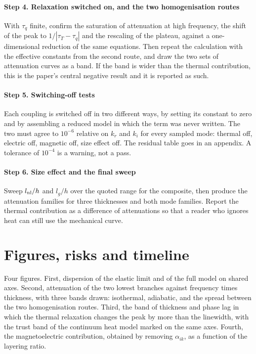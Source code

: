 \documentclass[11pt]{article}
\begin{document}
\paragraph{Step 4. Relaxation switched on, and the two homogenisation routes} With $\tau_q$ finite, confirm the
saturation of attenuation at high frequency, the shift of the peak to $1/|\tau_T-\tau_q|$ and the rescaling
of the plateau, against a one-dimensional reduction of the same equations. Then repeat the calculation with
the effective constants from the second route, and draw the two sets of attenuation curves as a band. If the
band is wider than the thermal contribution, this is the paper's central negative result and it is reported
as such.

\paragraph{Step 5. Switching-off tests} Each coupling is switched off in two different ways, by setting its
constant to zero and by assembling a reduced model in which the term was never written. The two must agree to
$10^{-6}$ relative on $k_r$ and $k_i$ for every sampled mode: thermal off, electric off, magnetic off, size
effect off. The residual table goes in an appendix. A tolerance of $10^{-4}$ is a warning, not a pass.

\paragraph{Step 6. Size effect and the final sweep} Sweep $l_{\rm nl}/h$ and $l_g/h$ over the quoted range for
the composite, then produce the attenuation families for three thicknesses and both mode families. Report the
thermal contribution as a difference of attenuations so that a reader who ignores heat can still use the
mechanical curve.

\section{Figures, risks and timeline}

Four figures. First, dispersion of the elastic limit and of the full model on shared axes. Second,
attenuation of the two lowest branches against frequency times thickness, with three bands drawn: isothermal,
adiabatic, and the spread between the two homogenisation routes. Third, the band of thickness and phase lag
in which the thermal relaxation changes the peak by more than the linewidth, with the trust band of the
continuum heat model marked on the same axes. Fourth, the magnetoelectric contribution, obtained by removing
$\alpha_{ik}$, as a function of the layering ratio.
\end{document}
